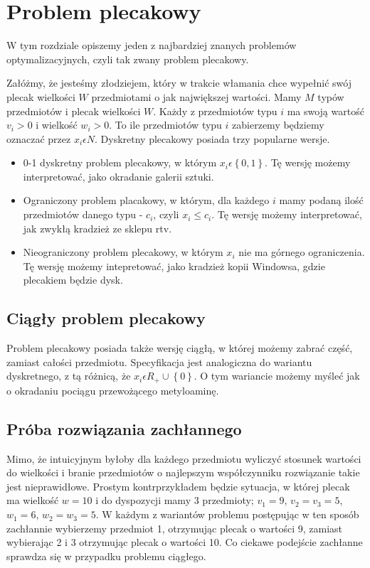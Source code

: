 \section{Problem plecakowy}

\label{sec:plecaki}

W tym rozdziale opiszemy jeden z najbardziej znanych problemów optymalizacyjnych, czyli tak zwany problem plecakowy.

Załóżmy, że jesteśmy złodziejem, który w trakcie włamania chce wypełnić swój plecak wielkości $W$ przedmiotami o jak największej wartości.
Mamy $M$ typów przedmiotów i plecak wielkości $W$.
Każdy z przedmiotów typu $i$ ma swoją wartość $v_i> 0$ i wielkość $w_i> 0$.
To ile przedmiotów typu $i$ zabierzemy będziemy oznaczać przez $x_i\epsilon N$.
Dyskretny plecakowy posiada trzy popularne wersje.


\begin{itemize}
  \item 0-1 dyskretny problem plecakowy, w którym $x_i \epsilon \left \{ 0, 1 \right \}$.
  Tę wersję możemy interpretować, jako okradanie galerii sztuki.
  \item Ograniczony problem placakowy, w którym, dla każdego $i$ mamy podaną ilość przedmiotów danego typu - $c_i$, czyli $x_i \leq c_i$.
  Tę wersję możemy interpretować, jak zwykłą kradzież ze sklepu rtv.
  \item Nieograniczony problem plecakowy, w którym $x_i$ nie ma górnego ograniczenia.
  Tę wersję możemy intepretować, jako kradzież kopii Windowsa, gdzie plecakiem będzie dysk.
\end{itemize}

\subsection{Ciągły problem plecakowy}
Problem plecakowy posiada także wersję ciągłą, w której możemy zabrać część, zamiast całości przedmiotu.
Specyfikacja jest analogiczna do wariantu dyskretnego, z tą różnicą, że $x_i \epsilon R_+ \cup \left \{ 0 \right \}$.
O tym wariancie możemy myśleć jak o okradaniu pociągu przewożącego metyloaminę.

\subsection{Próba rozwiązania zachłannego}
Mimo, że intuicyjnym byłoby dla każdego przedmiotu wyliczyć stosunek wartości do wielkości i branie przedmiotów
o najlepszym współczynniku rozwiązanie takie jest nieprawidłowe.
Prostym kontrprzykładem będzie sytuacja, w której plecak ma wielkość $w = 10$ i do dyspozycji mamy 3 przedmioty;
$v_1=9$, $v_2=v_3=5$, $w_1=6$, $w_2=w_3=5$. W każdym z wariantów problemu postępując w ten sposób zachłannie wybierzemy przedmiot 1,
otrzymując plecak o wartości 9, zamiast wybierając 2 i 3 otrzymując plecak o wartości 10.
Co ciekawe podejście zachłanne sprawdza się w przypadku problemu ciągłego.

